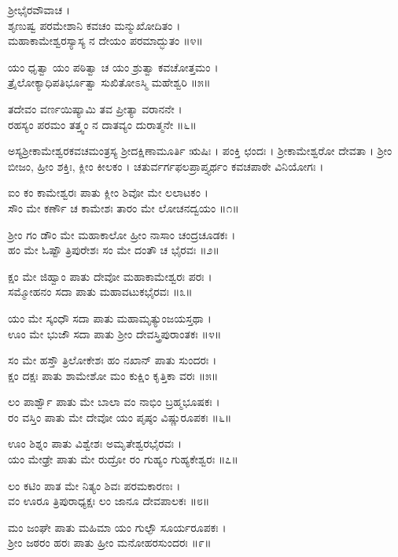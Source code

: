 ಶ್ರೀಭೈರವೌವಾಚ ।\\
ಶೃಣುಷ್ವ ಪರಮೇಶಾನಿ ಕವಚಂ ಮನ್ಮುಖೋದಿತಂ ।\\
ಮಹಾಕಾಮೇಶ್ವರಸ್ಯಾಸ್ಯ ನ ದೇಯಂ ಪರಮಾದ್ಭುತಂ ॥೪॥

ಯಂ ಧೃತ್ವಾ ಯಂ ಪಠಿತ್ವಾ ಚ ಯಂ ಶ್ರುತ್ವಾ ಕವಚೋತ್ತಮಂ ।\\
ತ್ರೈಲೋಕ್ಯಾಧಿಪತಿರ್ಭೂತ್ವಾ ಸುಖಿತೋಽಸ್ಮಿ ಮಹೇಶ್ವರಿ ॥೫॥

ತದೇವಂ ವರ್ಣಯಿಷ್ಯಾಮಿ ತವ ಪ್ರೀತ್ಯಾ ವರಾನನೇ ।\\
ರಹಸ್ಯಂ ಪರಮಂ ತತ್ತ್ವಂ ನ ದಾತವ್ಯಂ ದುರಾತ್ಮನೇ ॥೬॥

ಅಸ್ಯಶ್ರೀಕಾಮೇಶ್ವರಕವಚಮಂತ್ರಸ್ಯ ಶ್ರೀದಕ್ಷಿಣಾಮೂರ್ತಿ ಋಷಿಃ । ಪಂಕ್ತಿ ಛಂದಃ । ಶ್ರೀಕಾಮೇಶ್ವರೋ ದೇವತಾ । ಶ್ರೀಂ ಬೀಜಂ, ಹ್ರೀಂ ಶಕ್ತಿಃ, ಕ್ಲೀಂ ಕೀಲಕಂ । ಚತುರ್ವರ್ಗಫಲಪ್ರಾಪ್ತ್ಯರ್ಥಂ ಕವಚಪಾಠೇ ವಿನಿಯೋಗಃ ।\\

ಐಂ ಕಂ ಕಾಮೇಶ್ವರಃ ಪಾತು ಕ್ಲೀಂ ಶಿವೋ ಮೇ ಲಲಾಟಕಂ ।\\
ಸೌಂ ಮೇ ಕರ್ಣೌ ಚ ಕಾಮೇಶಃ ತಾರಂ ಮೇ ಲೋಚನದ್ವಯಂ ॥೧॥

ಶ್ರೀಂ ಗಂ ಡೌಂ ಮೇ ಮಹಾಕಾಲೋ ಹ್ರೀಂ ನಾಸಾಂ ಚಂದ್ರಚೂಡಕಃ ।\\
ಹಂ ಮೇ ಓಷ್ಟೌ ತ್ರಿಪುರೇಶಃ ಸಂ ಮೇ ದಂತೌ ಚ ಭೈರವಃ ॥೨॥

ಕ್ಷಂ ಮೇ ಜಿಹ್ವಾಂ ಪಾತು ದೇವೋ ಮಹಾಕಾಮೇಶ್ವರಃ ಪರಃ ।\\
ಸಮ್ಮೋಹನಂ ಸದಾ ಪಾತು ಮಹಾವಟುಕಭೈರವಃ ॥೩॥

ಯಂ ಮೇ ಸ್ಕಂಧೌ ಸದಾ ಪಾತು ಮಹಾಮೃತ್ಯುಂಜಯಸ್ತಥಾ ।\\
ಊಂ ಮೇ ಭುಜೌ ಸದಾ ಪಾತು ಶ್ರೀಂ ದೇವಸ್ತ್ರಿಪುರಾಂತಕಃ ॥೪॥

ಸಂ ಮೇ ಹಸ್ತೌ ತ್ರಿಲೋಕೇಶಃ ಹಂ ನಖಾನ್ ಪಾತು ಸುಂದರಃ ।\\
ಕ್ಷಂ ದಕ್ಷಃ ಪಾತು ಶಾಮೇಶೋ ಮಂ ಕುಕ್ಷಿಂ ಕೃತ್ತಿಕಾ ವರಃ ॥೫॥

ಲಂ ಪಾರ್ಶ್ವೌ ಪಾತು ಮೇ ಬಾಲಾ ವಂ ನಾಭಿಂ ಬ್ರಹ್ಮಭೂಷಕಃ ।\\
ರಂ ವಸ್ತಿಂ ಪಾತು ಮೇ ದೇವೋ ಯಂ ಪೃಷ್ಠಂ ವಿಷ್ಣುರೂಪಕಃ ॥೬॥

ಊಂ ಶಿಶ್ನಂ ಪಾತು ವಿಶ್ವೇಶಃ ಅಮೃತೇಶ್ವರಭೈರವಃ ।\\
ಯಂ ಮೇಢ್ರೇ ಪಾತು ಮೇ ರುದ್ರೋ ರಂ ಗುಹ್ಯಂ ಗುಹ್ಯಕೇಶ್ವರಃ ॥೭॥

ಲಂ ಕಟಿಂ ಪಾತ ಮೇ ನಿತ್ಯಂ ಶಿವಃ ಪರಮಕಾರಣಃ ।\\
ವಂ ಊರೂ ತ್ರಿಪುರಾಧ್ಯಕ್ಷಃ ಲಂ ಜಾನೂ ದೇವಪಾಲಕಃ ॥೮॥

ಮಂ ಜಂಘೇ ಪಾತು ಮಹಿಮಾ ಯಂ ಗುಲ್ಫೌ ಸೂರ್ಯರೂಪಕಃ ।\\
ಶ್ರೀಂ ಜಠರಂ ಹರಃ ಪಾತು ಹ್ರೀಂ ಮನೋಹರಸುಂದರಃ ॥೯॥

